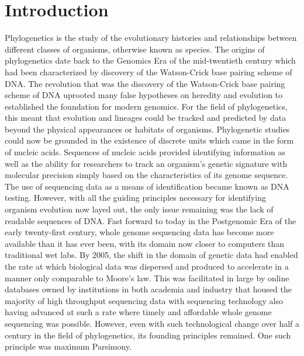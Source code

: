 \documentclass[12pt,journal,compsoc]{IEEEtran}
\begin{document}
\section{Introduction}
Phylogenetics is the study of the evolutionary histories and relationships between different classes of organisms, otherwise known as species. The origins of phylogenetics date back to the Genomics Era of the mid-twentieth century which had been characterized by discovery of the Watson-Crick base pairing scheme of DNA. The revolution that was the discovery of the Watson-Crick base pairing scheme of DNA uprooted many false hypotheses on heredity and evolution to established the foundation for modern genomics. For the field of phylogenetics, this meant that evolution and lineages could be tracked and predicted by data beyond the physical appearances or habitats of organisms. Phylogenetic studies could now be grounded in the existence of discrete units which came in the form of nucleic acids. Sequences of nucleic acids provided identifying information as well as the ability for researchers to track an organism’s genetic signature with molecular precision simply based on the characteristics of its genome sequence. The use of sequencing data as a means of identification became known as DNA testing. However, with all the guiding principles necessary for identifying organism evolution now layed out, the only issue remaining was the lack of readable sequences of DNA. Fast forward to today in the Postgenomic Era of the early twenty-first century, whole genome sequencing data has become more available than it has ever been, with its domain now closer to computers than traditional wet labs. By 2005, the shift in the domain of genetic data had enabled the rate at which biological data was dispersed and produced to accelerate in a manner only comparable to Moore’s law. This was facilitated in large by online databases owned by institutions in both academia and industry that housed the majority of high throughput sequencing data with sequencing technology also having advanced at such a rate where timely and affordable whole genome sequencing was possible. However, even with such technological change over half a century in the field of phylogenetics, its founding principles remained. One such principle was maximum Parsimony.
\end{document}
